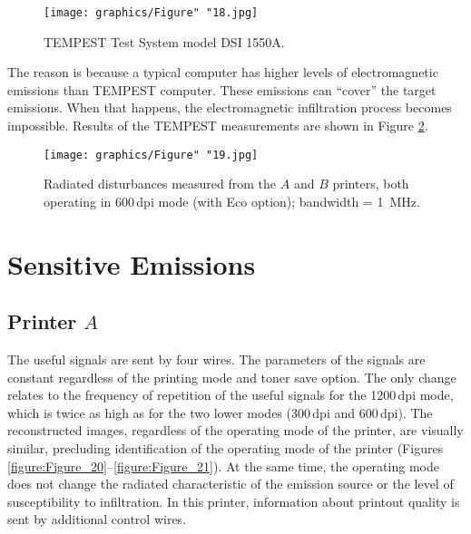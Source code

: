 \documentclass[12pt,a4paper]{article}
\begin{document}
\begin{figure}[ht]
    \centering
    \texttt{[image: graphics/Figure" "18.jpg]}
    \caption{TEMPEST Test System model DSI 1550A.}
    \label{figure:Figure_18}
\end{figure}

The reason is because a typical computer has higher levels of electromagnetic
emissions than TEMPEST computer. These emissions can ``cover'' the target
emissions. When that happens, the electromagnetic infiltration process
becomes impossible. Results of the TEMPEST measurements are shown in Figure
\ref{figure:Figure_19}.

\begin{figure}[ht]
    \centering
    \texttt{[image: graphics/Figure" "19.jpg]}
    \caption{Radiated disturbances measured from the $A$ and $B$ printers,
        both operating in 600\,dpi mode (with Eco option); bandwidth =
        \SI{1}{\mega\hertz}.}
    \label{figure:Figure_19}
\end{figure}

\section{Sensitive Emissions}

\subsection{Printer $A$}

The useful signals are sent by four wires. The parameters of the signals are
constant regardless of the printing mode and toner save option. The only
change relates to the frequency of repetition of the useful signals for the
1200\,dpi mode, which is twice as high as for the two lower modes (300\,dpi
and 600\,dpi). The reconstructed images, regardless of the operating mode of
the printer, are visually similar, precluding identification of the operating
mode of the printer (Figures \ref{figure:Figure_20}--\ref{figure:Figure_21}).
At the same time, the operating mode does not change the radiated
characteristic of the emission source or the level of susceptibility to
infiltration. In this printer, information about printout quality is sent by
additional control wires.
\end{document}
